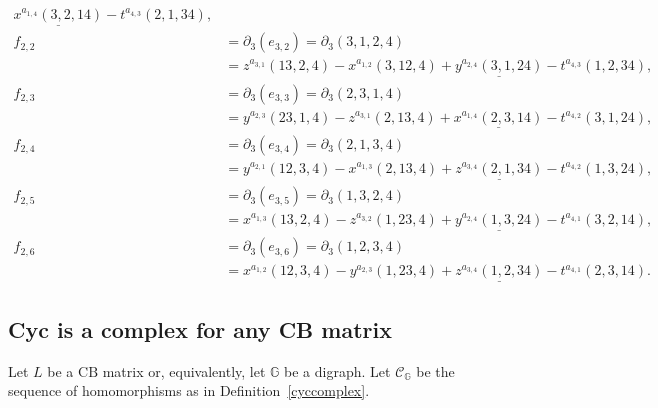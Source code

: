 \documentclass[ALCO]{cedram}
\newcommand{\mbg}{\mbox{$\mathbb{G}$}}
\newcommand{\mcc}{\mbox{$\mathcal{C}$}}
\newcommand{\cb}{\mbox{$\mathrm{CB}$}}
\newcommand{\dif}{\mbox{$\partial$}}
\begin{document}
\begin{example}
\begin{align*}
\underline{x^{a_{1,4}}(3,2,14)}-t^{a_{4,3}}(2,1,34),\\
f_{2,2}&= \dif_3(e_{3,2})=
\dif_3(3,1,2,4) \\&= z^{a_{3,1}}(13,2,4)-x^{a_{1,2}}(3,12,4)+
\underline{y^{a_{2,4}}(3,1,24)}-t^{a_{4,3}}(1,2,34),\\
f_{2,3}&=  \dif_3(e_{3,3})=
\dif_3(2,3,1,4)\\ &= y^{a_{2,3}}(23,1,4)-z^{a_{3,1}}(2,13,4)+
\underline{x^{a_{1,4}}(2,3,14)}-t^{a_{4,2}}(3,1,24),\\
f_{2,4}&= \dif_3(e_{3,4})=
\dif_3(2,1,3,4)\\ &= y^{a_{2,1}}(12,3,4)-x^{a_{1,3}}(2,13,4)
+\underline{z^{a_{3,4}}(2,1,34)}-t^{a_{4,2}}(1,3,24),\\
f_{2,5}&=\dif_3(e_{3,5})=
\dif_3(1,3,2,4)\\ &= x^{a_{1,3}}(13,2,4)-z^{a_{3,2}}(1,23,4)+
\underline{y^{a_{2,4}}(1,3,24)}-t^{a_{4,1}}(3,2,14),\\
f_{2,6}&= \dif_3(e_{3,6})= 
\dif_3(1,2,3,4)\\ &= x^{a_{1,2}}(12,3,4)-y^{a_{2,3}}(1,23,4)+
\underline{z^{a_{3,4}}(1,2,34)}-t^{a_{4,1}}(2,3,14).
\end{align*}
\end{example}

\subsection{Cyc is a complex for any CB matrix}\label{cyc-complex-cb}

 Let $L$ be a $\cb$ matrix or, equivalently, let $\mbg$ be a
digraph. Let $\mcc_{\mathbb{G}}$ be the sequence of homomorphisms as
in Definition~\ref{cyccomplex}.
\end{document}
